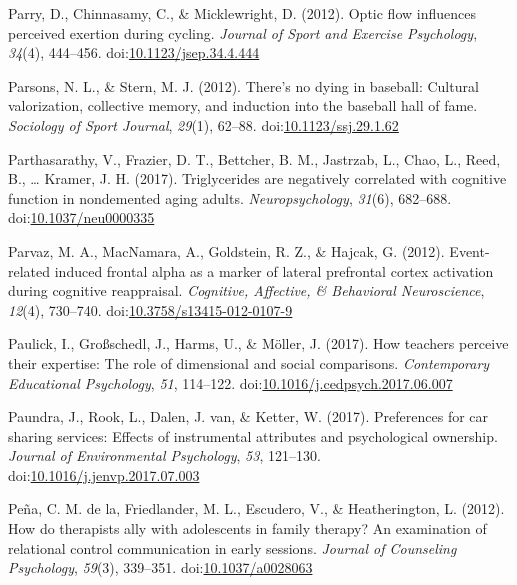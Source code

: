 \documentclass[english,man]{apa6}
\begin{document}
\hypertarget{ref-Parry2012}{}
Parry, D., Chinnasamy, C., \& Micklewright, D. (2012). Optic flow
influences perceived exertion during cycling. \emph{Journal of Sport and
Exercise Psychology}, \emph{34}(4), 444--456.
doi:\href{https://doi.org/10.1123/jsep.34.4.444}{10.1123/jsep.34.4.444}

\hypertarget{ref-Parsons2012}{}
Parsons, N. L., \& Stern, M. J. (2012). There's no dying in baseball:
Cultural valorization, collective memory, and induction into the
baseball hall of fame. \emph{Sociology of Sport Journal}, \emph{29}(1),
62--88.
doi:\href{https://doi.org/10.1123/ssj.29.1.62}{10.1123/ssj.29.1.62}

\hypertarget{ref-Parthasarathy2017}{}
Parthasarathy, V., Frazier, D. T., Bettcher, B. M., Jastrzab, L., Chao,
L., Reed, B., \ldots{} Kramer, J. H. (2017). Triglycerides are
negatively correlated with cognitive function in nondemented aging
adults. \emph{Neuropsychology}, \emph{31}(6), 682--688.
doi:\href{https://doi.org/10.1037/neu0000335}{10.1037/neu0000335}

\hypertarget{ref-Parvaz2012}{}
Parvaz, M. A., MacNamara, A., Goldstein, R. Z., \& Hajcak, G. (2012).
Event-related induced frontal alpha as a marker of lateral prefrontal
cortex activation during cognitive reappraisal. \emph{Cognitive,
Affective, \& Behavioral Neuroscience}, \emph{12}(4), 730--740.
doi:\href{https://doi.org/10.3758/s13415-012-0107-9}{10.3758/s13415-012-0107-9}

\hypertarget{ref-Paulick2017}{}
Paulick, I., Großschedl, J., Harms, U., \& Möller, J. (2017). How
teachers perceive their expertise: The role of dimensional and social
comparisons. \emph{Contemporary Educational Psychology}, \emph{51},
114--122.
doi:\href{https://doi.org/10.1016/j.cedpsych.2017.06.007}{10.1016/j.cedpsych.2017.06.007}

\hypertarget{ref-Paundra2017}{}
Paundra, J., Rook, L., Dalen, J. van, \& Ketter, W. (2017). Preferences
for car sharing services: Effects of instrumental attributes and
psychological ownership. \emph{Journal of Environmental Psychology},
\emph{53}, 121--130.
doi:\href{https://doi.org/10.1016/j.jenvp.2017.07.003}{10.1016/j.jenvp.2017.07.003}

\hypertarget{ref-DelaPena2012}{}
Peña, C. M. de la, Friedlander, M. L., Escudero, V., \& Heatherington,
L. (2012). How do therapists ally with adolescents in family therapy? An
examination of relational control communication in early sessions.
\emph{Journal of Counseling Psychology}, \emph{59}(3), 339--351.
doi:\href{https://doi.org/10.1037/a0028063}{10.1037/a0028063}
\end{document}
